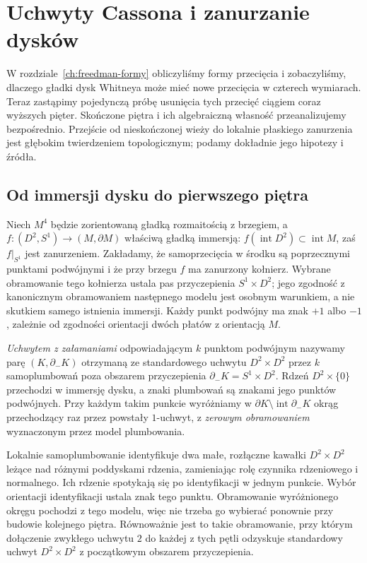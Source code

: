 \chapter{Uchwyty Cassona i zanurzanie dysków}
\label{ch:uchwyty-cassona}

W rozdziale~\ref{ch:freedman-formy} obliczyliśmy formy
przecięcia i zobaczyliśmy, dlaczego gładki dysk Whitneya
może mieć nowe przecięcia w czterech wymiarach.
Teraz zastąpimy pojedynczą próbę usunięcia tych przecięć
ciągiem coraz wyższych pięter. Skończone piętra i ich
algebraiczną własność przeanalizujemy bezpośrednio.
Przejście od nieskończonej wieży do lokalnie płaskiego
zanurzenia jest głębokim twierdzeniem topologicznym;
podamy dokładnie jego hipotezy i źródła.

\section{Od immersji dysku do pierwszego piętra}
\label{sec:casson-kinky}

Niech $M^4$ będzie zorientowaną gładką rozmaitością
z brzegiem, a
$f:(D^2,S^1)\to(M,\partial M)$ właściwą gładką
immersją: $f(\operatorname{int}D^2)\subset
\operatorname{int}M$, zaś $f|_{S^1}$ jest zanurzeniem.
Zakładamy, że samoprzecięcia w środku są poprzecznymi
punktami podwójnymi i że przy brzegu $f$ ma zanurzony
kołnierz. Wybrane obramowanie tego kołnierza
ustala pas przyczepienia $S^1\times D^2$; jego
zgodność z kanonicznym obramowaniem następnego
modelu jest osobnym warunkiem, a nie skutkiem
samego istnienia immersji.
Każdy punkt podwójny ma znak $+1$ albo $-1$,
zależnie od zgodności orientacji dwóch płatów z
orientacją $M$.

\begin{definicja}
\label{def:casson-kinky}
\emph{Uchwytem z załamaniami} odpowiadającym
$k$ punktom podwójnym nazywamy parę
$(K,\partial_-K)$ otrzymaną ze standardowego
uchwytu $D^2\times D^2$ przez $k$ samoplumbowań
poza obszarem przyczepienia
$\partial_-K=S^1\times D^2$. Rdzeń
$D^2\times\{0\}$ przechodzi w immersję dysku,
a znaki plumbowań są znakami jego punktów
podwójnych. Przy każdym takim punkcie wyróżniamy
w $\partial K\setminus\operatorname{int}\partial_-K$
okrąg przechodzący raz przez powstały $1$-uchwyt,
z \emph{zerowym obramowaniem} wyznaczonym przez
model plumbowania.
\end{definicja}

Lokalnie samoplumbowanie identyfikuje dwa małe,
rozłączne kawałki $D^2\times D^2$ leżące nad
różnymi poddyskami rdzenia, zamieniając rolę
czynnika rdzeniowego i normalnego. Ich rdzenie
spotykają się po identyfikacji w jednym punkcie.
Wybór orientacji identyfikacji ustala znak tego
punktu. Obramowanie wyróżnionego okręgu
pochodzi z tego modelu, więc nie trzeba go
wybierać ponownie przy budowie kolejnego piętra.
Równoważnie jest to takie obramowanie, przy którym
dołączenie zwykłego uchwytu $2$ do każdej z tych
pętli odzyskuje standardowy uchwyt $D^2\times D^2$
z początkowym obszarem przyczepienia.

